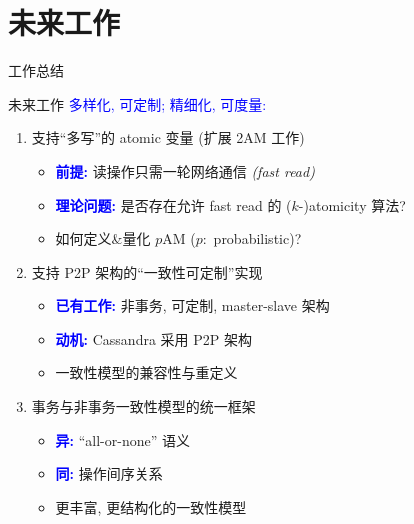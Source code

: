 \section{未来工作}

\begin{frame}{工作总结}
\end{frame}

\begin{frame}{未来工作}
  \textcolor{blue}{多样化, 可定制; 精细化, 可度量:}
  \begin{enumerate}
    \item 支持``多写''的 atomic 变量 (扩展 2AM 工作)
      {
      \begin{itemize}
        \setlength\itemsep{3pt}
        \item \textcolor{blue}{\bf 前提:} 读操作只需一轮网络通信 \emph{(fast read)}
        \item \textcolor{blue}{\bf 理论问题:} 是否存在允许 fast read 的 ($k$-)atomicity 算法?
        \item {} 如何定义\&量化 $p$AM ($p:$ probabilistic)?
      \end{itemize}
      }
    \vspace{0.30cm}
    \item 支持 P2P 架构的``一致性可定制''实现
      {
      \begin{itemize}
        \setlength\itemsep{3pt}
        \item \textcolor{blue}{\bf 已有工作:} 非事务, 可定制, master-slave 架构 
        \item \textcolor{blue}{\bf 动机:} Cassandra 采用 P2P 架构 
        \item {} 一致性模型的兼容性与重定义
      \end{itemize}
      }
    \vspace{0.30cm}
    \item 事务与非事务一致性模型的统一框架
      {
      \begin{itemize}
        \item \textcolor{blue}{\bf 异:} ``all-or-none'' 语义
        \item \textcolor{blue}{\bf 同:} 操作间序关系
        \item {} 更丰富, 更结构化的一致性模型
      \end{itemize}
      }
  \end{enumerate}
\end{frame}

